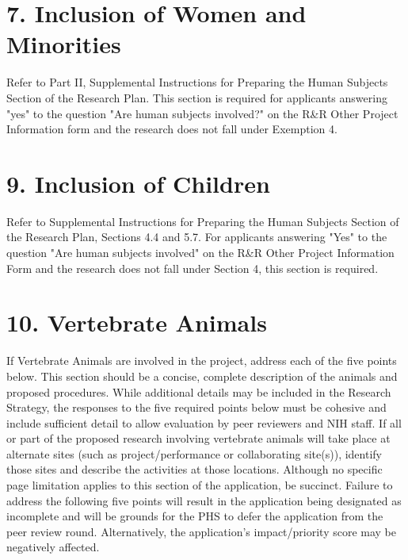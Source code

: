 \documentclass[11pt,notitlepage]{article}
\begin{document}
\newpage

\section*{7. Inclusion of Women and Minorities}

Refer to Part II, Supplemental Instructions for Preparing the Human Subjects Section of the Research Plan. This section is required for applicants answering "yes" to the question "Are human subjects involved?" on the R\&R Other Project Information form and the research does not fall under Exemption 4.


\newpage

\section*{9. Inclusion of Children}

Refer to Supplemental Instructions for Preparing the Human Subjects Section of the Research Plan, Sections 4.4 and 5.7. For applicants answering "Yes" to the question "Are human subjects involved" on the R\&R Other Project Information Form and the research does not fall under Section 4, this section is required.


\newpage

\section*{10. Vertebrate Animals}

If Vertebrate Animals are involved in the project, address each of the five points below. This section should be a concise, complete description of the animals and proposed procedures. While additional details may be included in the Research Strategy, the responses to the five required points below must be cohesive and include sufficient detail to allow evaluation by peer reviewers and NIH staff. If all or part of the proposed research involving vertebrate animals will take place at alternate sites (such as project/performance or collaborating site(s)), identify those sites and describe the activities at those locations. Although no specific page limitation applies to this section of the application, be succinct. Failure to address the following five points will result in the application being designated as incomplete and will be grounds for the PHS to defer the application from the peer review round. Alternatively, the application’s impact/priority score may be negatively affected.
\end{document}
